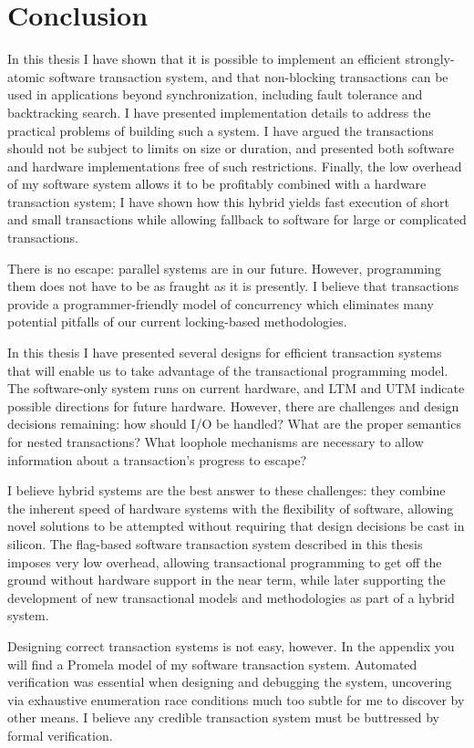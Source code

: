 \chapter{Conclusion}

In this thesis I have shown that it is possible to implement an
efficient strongly-atomic software transaction system, and that
non-blocking transactions can be used in applications beyond
synchronization, including fault tolerance and backtracking search.  I
have presented implementation details to address the practical
problems of building such a system.  I have argued the transactions
should not be subject to limits on size or duration, and presented
both software and hardware implementations free of such restrictions.
Finally, the low overhead of my software system allows it to be
profitably combined with a hardware transaction system; I have shown
how this hybrid yields fast execution of short and small transactions
while allowing fallback to software for large or complicated
transactions.

There is no escape: parallel systems are in our future.  However,
programming them does not have to be as fraught as it is presently.
I believe that transactions provide a programmer-friendly model
of concurrency which eliminates many potential pitfalls of our
current locking-based methodologies.

In this thesis I have presented several designs for efficient
transaction systems that will enable us to take advantage of the
transactional programming model.  The software-only system runs on
current hardware, and LTM and UTM indicate possible directions for future
hardware.  However, there are challenges and design decisions
remaining: how should I/O be handled?  What are the proper semantics
for nested transactions?  What loophole mechanisms are necessary to
allow information about a transaction's progress to escape?

I believe hybrid systems are the best answer to these challenges: they
combine the
inherent speed of hardware systems with the
flexibility of software, allowing novel solutions to be attempted
without requiring that design decisions be cast in silicon.  The
flag-based software transaction system described in this thesis
imposes very low overhead, allowing transactional
programming to get off the ground without hardware support in the near
term, while later supporting the development of new transactional models and
methodologies as part of a hybrid system.

Designing correct transaction systems is not easy, however.  In the
appendix you will find a Promela model of my software transaction
system.  Automated verification was essential when designing and
debugging the system, uncovering via exhaustive enumeration race
conditions much too subtle for me to discover by other means.  I
believe any credible transaction system must be buttressed by formal
verification.

